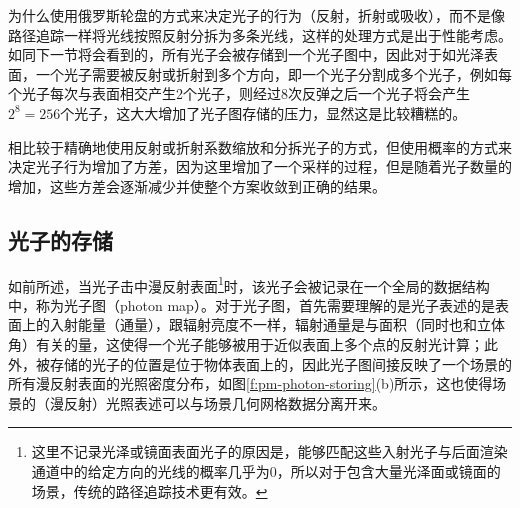 为什么使用俄罗斯轮盘的方式来决定光子的行为（反射，折射或吸收），而不是像路径追踪一样将光线按照反射分拆为多条光线，这样的处理方式是出于性能考虑。如同下一节将会看到的，所有光子会被存储到一个光子图中，因此对于如光泽表面，一个光子需要被反射或折射到多个方向，即一个光子分割成多个光子，例如每个光子每次与表面相交产生2个光子，则经过8次反弹之后一个光子将会产生$2^8=256$个光子，这大大增加了光子图存储的压力，显然这是比较糟糕的。

相比较于精确地使用反射或折射系数缩放和分拆光子的方式，但使用概率的方式来决定光子行为增加了方差，因为这里增加了一个采样的过程，但是随着光子数量的增加，这些方差会逐渐减少并使整个方案收敛到正确的结果。





\subsection{光子的存储}\label{sec:pm-photon-storing}
如前所述，当光子击中漫反射表面\footnote{这里不记录光泽或镜面表面光子的原因是，能够匹配这些入射光子与后面渲染通道中的给定方向的光线的概率几乎为0，所以对于包含大量光泽面或镜面的场景，传统的路径追踪技术更有效。}时，该光子会被记录在一个全局的数据结构中，称为光子图（photon map）。对于光子图，首先需要理解的是光子表述的是表面上的入射能量（通量），跟辐射亮度不一样，辐射通量是与面积（同时也和立体角）有关的量，这使得一个光子能够被用于近似表面上多个点的反射光计算；此外，被存储的光子的位置是位于物体表面上的，因此光子图间接反映了一个场景的所有漫反射表面的光照密度分布，如图\ref{f:pm-photon-storing}(b)所示，这也使得场景的（漫反射）光照表述可以与场景几何网格数据分离开来。

